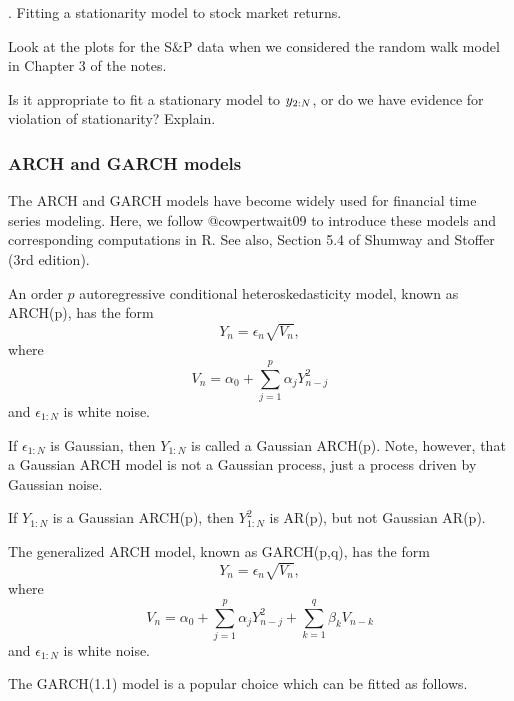 \documentclass{beamer}\usepackage[]{graphicx}\usepackage[]{color}
\newcommand\answer[2]{#1} %
\begin{document}
\begin{frame}[fragile]


\myquestion. Fitting a stationarity model to stock market returns.

\bi

\item Look at the plots for the S\&P data when we considered the random walk model in Chapter 3 of the notes.

\item Is it appropriate to fit a stationary model to $y_{2:N}$, or do we have evidence for violation of stationarity? Explain.

\ei

\answer{\vspace{30mm}}{todo}

\end{frame}

\begin{frame}[fragile]

\frametitle{ARCH and GARCH models}

\bi

\item The ARCH and GARCH models have become widely used for financial time series modeling. Here, we follow @cowpertwait09 to introduce these models and corresponding computations in R. See also, Section 5.4 of Shumway and Stoffer (3rd edition). 

\item An order $p$ autoregressive conditional heteroskedasticity model, known as ARCH(p), has the form
$$ Y_n = \epsilon_n \sqrt{V_n},$$
where
$$ V_n = \alpha_0 + \sum_{j=1}^p \alpha_j Y_{n-j}^2$$
and $\epsilon_{1:N}$ is white noise.

\item If $\epsilon_{1:N}$ is Gaussian, then $Y_{1:N}$ is called a Gaussian ARCH(p). Note, however, that a Gaussian ARCH model is not a Gaussian process, just a process driven by Gaussian noise.

\item If  $Y_{1:N}$ is a Gaussian ARCH(p), then  $Y_{1:N}^2$ is AR(p), but not Gaussian AR(p).

\item The generalized ARCH model, known as GARCH(p,q), has the form
$$ Y_n = \epsilon_n \sqrt{V_n},$$
where
$$ V_n = \alpha_0 + \sum_{j=1}^p \alpha_j Y_{n-j}^2 + \sum_{k=1}^q \beta_k V_{n-k}$$
and $\epsilon_{1:N}$ is white noise.


\item The GARCH(1.1) model is a popular choice \citep{cowpertwait09} which can be fitted as follows.

\ei

\end{frame}
\end{document}
